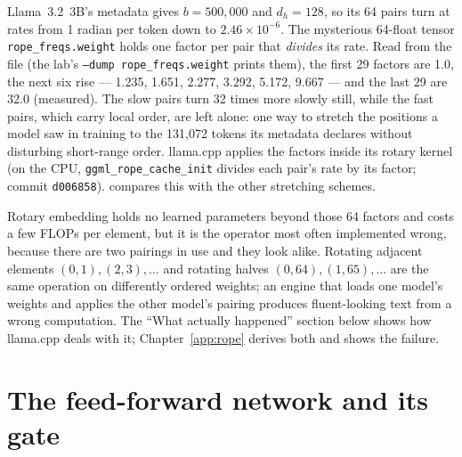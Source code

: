 Llama~3.2~3B's metadata gives $b = 500{,}000$ and $d_h = 128$, so its 64 pairs
turn at rates from 1 radian per token down to $2.46 \times 10^{-6}$. The
mysterious 64-float tensor \texttt{rope\_freqs.weight} holds one factor per pair
that \emph{divides} its rate. Read from the file (the lab's \texttt{--dump
rope\_freqs.weight} prints them), the first 29 factors are 1.0,
the next six rise --- 1.235, 1.651, 2.277, 3.292, 5.172, 9.667 --- and the last
29 are 32.0 (measured). The slow pairs turn 32 times more slowly still, while
the fast pairs, which carry local order, are left alone: one way to stretch the
positions a model saw in training to the 131,072 tokens its metadata declares
without disturbing short-range order. llama.cpp applies the factors inside its
rotary kernel (on the CPU, \texttt{ggml\_rope\_cache\_init} divides each pair's
rate by its factor; commit \texttt{d006858}).  compares this
with the other stretching schemes.

Rotary embedding holds no learned parameters beyond those 64 factors and costs a
few FLOPs per element, but it is the operator most often implemented wrong,
because there are two pairings in use and they look alike. Rotating adjacent
elements $(0, 1), (2, 3), \ldots$ and rotating halves $(0, 64), (1, 65), \ldots$
are the same operation on differently ordered weights; an engine that loads one
model's weights and applies the other model's pairing produces fluent-looking
text from a wrong computation. The ``What actually happened'' section below
shows how llama.cpp deals with it; Chapter~\ref{app:rope} derives both and
shows the failure.

\section{The feed-forward network and its gate}

